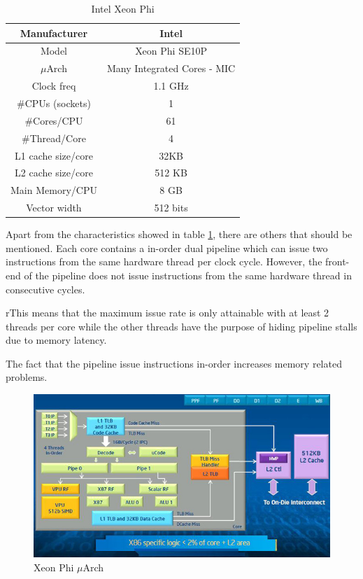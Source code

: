 \documentclass[abstract=on,9pt,twocolumn]{scrartcl}
\begin{document}
\begin{table}[H]
\centering
\footnotesize
\begin{tabular}{| c | c |}\hline
Manufacturer & Intel\\ \hline
Model & Xeon Phi SE10P\\ \hline
$\mu$Arch & Many Integrated Cores - MIC\\ \hline
Clock freq & 1.1 GHz\\ \hline
\#CPUs (sockets) & 1 \\ \hline
\#Cores/CPU & 61\\ \hline
\#Thread/Core & 4\\ \hline
L1 cache size/core & 32KB\\ \hline
L2 cache size/core & 512 KB\\ \hline
Main Memory/CPU & 8 GB\\ \hline
Vector width & 512 bits\\ \hline
\end{tabular}
\label{tab:mic}
\caption{Intel Xeon Phi}
\end{table}




Apart from the characteristics showed in table \ref{tab:mic}, there are
others that should be mentioned. Each core contains a in-order dual
pipeline which can issue two instructions from the same hardware thread
per clock cycle. However, the front-end of the pipeline does not issue
instructions from the same hardware thread in consecutive cycles.\cite{Cepeda:PhiPerformance}

rThis means that the maximum issue rate is only attainable with at least
2 threads per core while the other threads have the purpose of hiding
pipeline stalls due to memory latency. %

The fact that the pipeline issue instructions in-order increases
memory related problems. %

\begin{center}
\begin{figure}[htb]
    \includegraphics[width=\columnwidth]{img/phi_arch.jpg}
    \caption{Xeon Phi $\mu$Arch}
    \label{img:phi_arch}
\end{figure}
\end{center}
\end{document}
